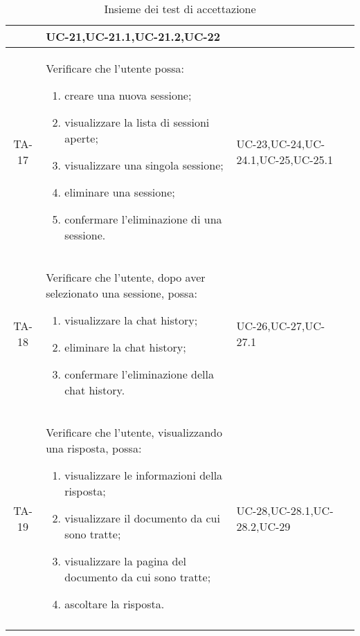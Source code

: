 \begin{xltabular}{\textwidth}{| c | X | X | c |}
\begin{enumerate}
    \end{enumerate}& UC-21,\newline UC-21.1,\newline UC-21.2,\newline UC-22 & \textcolor{xmarkcolor}{} \\
    \hline
     TA-17 & Verificare che l’utente possa:
    \begin{enumerate}
        \item creare una nuova sessione;
        \item visualizzare la lista di sessioni aperte;
        \item visualizzare una singola sessione;
        \item eliminare una sessione;
        \item confermare l'eliminazione di una sessione.
        
        
    \end{enumerate}& UC-23,\newline UC-24,\newline UC-24.1,\newline UC-25,\newline UC-25.1 & \textcolor{xmarkcolor}{} \\
    \hline
    TA-18 & Verificare che l'utente, dopo aver selezionato una sessione, possa:
    \begin{enumerate}
        \item visualizzare la chat history;
        \item eliminare la chat history;
        \item confermare l'eliminazione della chat history.
        
    \end{enumerate}& UC-26,\newline UC-27,\newline UC-27.1 & \textcolor{xmarkcolor}{}  \\
    \hline
    
     TA-19 & Verificare che l'utente, visualizzando una risposta, possa:
    \begin{enumerate}
        \item visualizzare le informazioni della risposta;
        \item visualizzare il documento da cui sono tratte;
        \item visualizzare la pagina del documento da cui sono tratte;
        \item ascoltare la risposta.
        
    \end{enumerate}& UC-28,\newline UC-28.1,\newline UC-28.2,\newline UC-29 & \textcolor{xmarkcolor}{} \\
    \hline

     \caption{Insieme dei test di accettazione} 
    
\end{xltabular}
\endgroup


